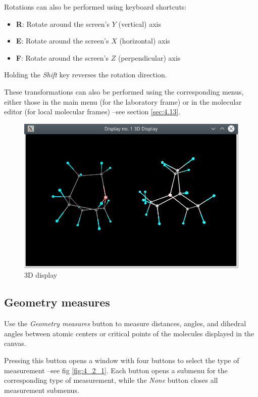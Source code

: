 \documentclass[10pt]{article}
\begin{document}
Rotations can also be performed using keyboard shortcuts:  
\begin{itemize}
    \item {\bf R}: Rotate around the screen’s $Y$ (vertical) axis  
    \item {\bf E}: Rotate around the screen’s $X$ (horizontal) axis  
    \item {\bf F}: Rotate around the screen’s $Z$ (perpendicular) axis  
\end{itemize}

Holding the {\it Shift} key reverses the rotation direction.  

\vspace*{5mm}{\bf Alternative Methods for Transformations}\vspace*{5mm}  

These transformations can also be performed using the corresponding menus,  
either those in the main menu (for the laboratory frame) or in the molecular editor  
(for local molecular frames) --see section \ref{sec:4.13}.  


\begin{figure}[H]
\begin{center}
\includegraphics[width=0.4\linewidth]{damqt320_3D_display.png}
\end{center}
\caption{{3D display}\label{fig:4_1_2}}
\end{figure}



\subsection{Geometry measures \label{sec:4.2}}

Use the {\it Geometry measures} button to measure distances, angles, and dihedral angles  
between atomic centers or critical points of the molecules displayed in the canvas.  

Pressing this button opens a window with four buttons to select the type of measurement --see fig \ref{fig:4_2_1}.  
Each button opens a submenu for the corresponding type of measurement, while the {\it None} button  
closes all measurement submenus.  
\end{document}
